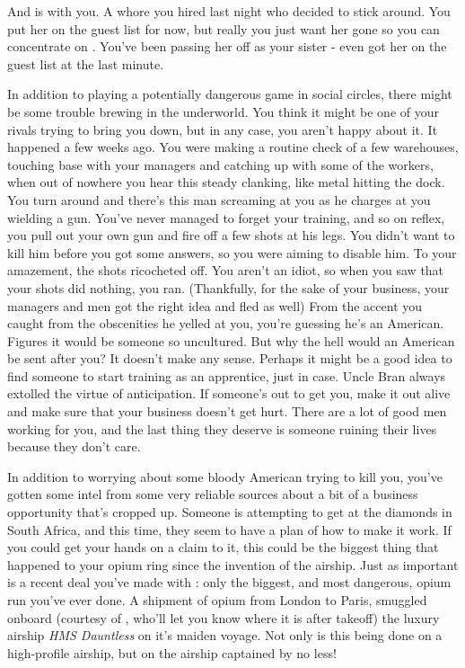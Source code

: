 \documentclass[char]{airship}
\begin{document}
And \cNPCWhore{\intro} is with you. A whore you hired last night who decided
to stick around.  You put her on the guest list for now, but really
you just want her gone so you can concentrate on \cThief{}. You've
been passing her off as your sister - even got her on the guest list
at the last minute.

In addition to playing a potentially dangerous game in social circles,
there might be some trouble brewing in the underworld.  You think it
might be one of your rivals trying to bring you down, but in any case,
you aren't happy about it.  It happened a few weeks ago.  You were
making a routine check of a few warehouses, touching base with your
managers and catching up with some of the workers, when out of nowhere
you hear this steady clanking, like metal hitting the dock.  You turn
around and there's this man screaming at you as he charges at you
wielding a gun.  You've never managed to forget your training, and so
on reflex, you pull out your own gun and fire off a few shots at his
legs.  You didn't want to kill him before you got some answers, so you
were aiming to disable him.  To your amazement, the shots ricocheted
off.  You aren't an idiot, so when you saw that your shots did
nothing, you ran.  (Thankfully, for the sake of your business, your
managers and men got the right idea and fled as well) From the accent
you caught from the obscenities he yelled at you, you're guessing he's
an American.  Figures it would be someone so uncultured.  But why the
hell would an American be sent after you?  It doesn't make any sense.
Perhaps it might be a good idea to find someone to start training as
an apprentice, just in case.  Uncle Bran always extolled the virtue of
anticipation.  If someone's out to get you, make it out alive and make
sure that your business doesn't get hurt.  There are a lot of good men
working for you, and the last thing they deserve is someone ruining
their lives because they don't care.

In addition to worrying about some bloody American trying to kill you,
you've gotten some intel from some very reliable sources about a bit
of a business opportunity that's cropped up.  Someone is attempting to get at the diamonds in South Africa, and this time, they seem to have a plan of how to make it work.  If you could get your hands on a
claim to it, this could be the biggest thing that happened to your
opium ring since the invention of the airship.  Just as important is a
recent deal you've made with \cBoddy{}: only the biggest, and most
dangerous, opium run you've ever done.  A shipment of opium from
London to Paris, smuggled onboard (courtesy of \cBoddy{}, who'll let
you know where it is after takeoff) the luxury airship {\it HMS
Dauntless} on it's maiden voyage.  Not only is this being done on a
high-profile airship, but on the airship captained by \cCaptain{} no
less!
\end{document}
